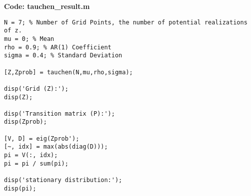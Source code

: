 \documentclass{ltjsarticle}
\begin{document}
\noindent\textbf{Code: tauchen\_result.m}
\lstset{style=matlab}
\begin{lstlisting}
N = 7; % Number of Grid Points, the number of potential realizations of z.
mu = 0; % Mean
rho = 0.9; % AR(1) Coefficient
sigma = 0.4; % Standard Deviation

[Z,Zprob] = tauchen(N,mu,rho,sigma);

disp('Grid (Z):');
disp(Z);

disp('Transition matrix (P):');
disp(Zprob);

[V, D] = eig(Zprob');
[~, idx] = max(abs(diag(D)));
pi = V(:, idx); 
pi = pi / sum(pi);

disp('stationary distribution:');
disp(pi);
\end{lstlisting}
\end{document}
